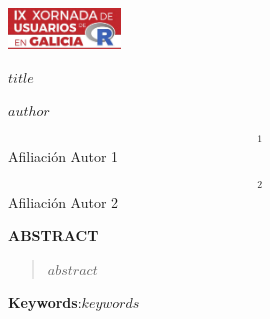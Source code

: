 \begin{flushright}
\includegraphics[angle=0,keepaspectratio,width=3cm]{logo.pdf}
\end{flushright}

 \vspace{20pt}

\begin{center}
\textbf{$title$}

\vspace{0.15cm}

$author$ 
\end{center}

\vspace{0.06cm}

$$^{1}$$Afiliaci\'on Autor 1

$$^{2}$$Afiliaci\'on Autor 2

\begin{center}
\textbf{ABSTRACT}
\end{center}

\begin{quotation}
\noindent $abstract$
\end{quotation}

\vspace{0.4cm}

\textbf{Keywords}:$keywords$

\vspace{0.4cm}


